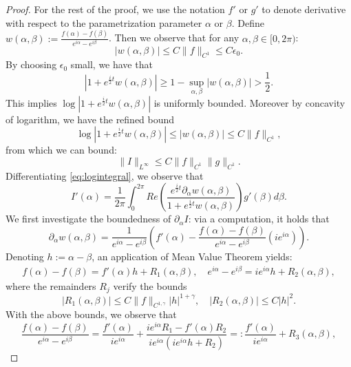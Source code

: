 \documentclass[11pt,reqno]{amsproc}
\newcommand{\eps}{\epsilon}
\newcommand{\p}{\partial}
\newcommand{\palpha}{\p_\alpha}
\begin{document}
\begin{proof}
    For the rest of the proof, we use the notation $f'$ or $g'$ to denote derivative with respect to the parametrization parameter $\alpha$ or $\beta$. 
    Define $w(\alpha,\beta) := \frac{f(\alpha) - f(\beta)}{e^{i\alpha} - e^{i\beta}}$. Then we observe that for any $\alpha,\beta \in [0,2\pi)$:
    $$
    |w(\alpha, \beta)| \le C\|f\|_{C^1} \le C\eps_0.
    $$
    By choosing $\eps_0$ small, we have that
    \begin{equation}\label{est:nondeg}
        |1+ e^{\frac{i}{2}t} w(\alpha,\beta)| \ge 1 - \sup_{\alpha,\beta}|w(\alpha,\beta)| > \frac12.
    \end{equation}
    This implies $\log|1+ e^{\frac{i}{2}t} w(\alpha,\beta)|$ is uniformly bounded. Moreover by concavity of logarithm, we have the refined bound
    $$
    \log |1+ e^{\frac{i}{2}t} w(\alpha,\beta)| \le |w(\alpha,\beta)| \le C\|f\|_{C^1},
    $$
    from which we can  bound:
    \begin{equation}
        \label{est:logintegralLinfty}
        \|I\|_{L^\infty} \le C\|f\|_{C^1}\|g\|_{C^1}.
    \end{equation}
    Differentiating \eqref{eq:logintegral}, we observe that
    \begin{equation}
        \label{eq:paI}
        I'(\alpha) = \frac{1}{2\pi}\int_0^{2\pi}Re\left(\frac{e^{\frac{i}{2}t} \palpha w(\alpha,\beta)}{1+ e^{\frac{i}{2}t} w(\alpha,\beta)}\right) g'(\beta) d\beta.
    \end{equation}
    We first investigate the boundedness of $\palpha I$: via a computation, it holds that
    \begin{equation}
        \label{paw}
        \palpha w(\alpha,\beta) = \frac{1}{e^{i\alpha} - e^{i\beta}}\left(f'(\alpha) - \frac{f(\alpha) - f(\beta)}{e^{i\alpha} - e^{i\beta}}(ie^{i\alpha})\right).
    \end{equation}
    Denoting $h := \alpha - \beta$, an application of Mean Value Theorem yields:
    \begin{align*}
        f(\alpha) - f(\beta) = f'(\alpha) h + R_1(\alpha,\beta),\quad e^{i\alpha} - e^{i\beta} = ie^{i\alpha}h + R_2(\alpha,\beta),
    \end{align*}
    where the remainders $R_{j}$ verify the bounds
    $$
    |R_1(\alpha,\beta)| \le C\|f\|_{C^{1,\gamma}}|h|^{1+\gamma},\quad |R_2(\alpha,\beta)| \le C |h|^2.
    $$
    With the above bounds, we observe that
    $$
    \frac{f(\alpha) - f(\beta)}{e^{i\alpha} - e^{i\beta}} = \frac{f'(\alpha)}{ie^{i\alpha}} + \frac{ie^{i\alpha}R_1 - f'(\alpha) R_2}{ie^{i\alpha}(ie^{i\alpha} h + R_2)}=: \frac{f'(\alpha)}{ie^{i\alpha}} + R_3(\alpha,\beta), 
$$
\end{proof}
\end{document}
